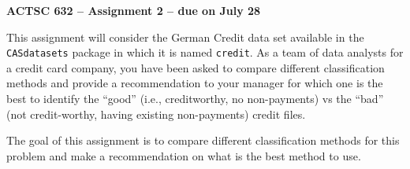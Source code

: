 \documentclass[11pt]{article}
\begin{document}
\begin{center}
{\large \bf ACTSC 632 -- Assignment 2 -- due on July 28} \\
\end{center}

This assignment will consider the German Credit data set available in the {\tt CASdatasets} package in which it is named {\tt credit}.  As a team of data analysts for a credit card company, you have been asked to compare different classification methods and provide a recommendation to your manager for which one is the best to identify the ``good'' (i.e., creditworthy, no non-payments) vs the ``bad'' (not credit-worthy, having existing non-payments) credit files.

The goal of this assignment is to compare different classification methods for this problem and make a recommendation on what is the best method to use.
\end{document}
